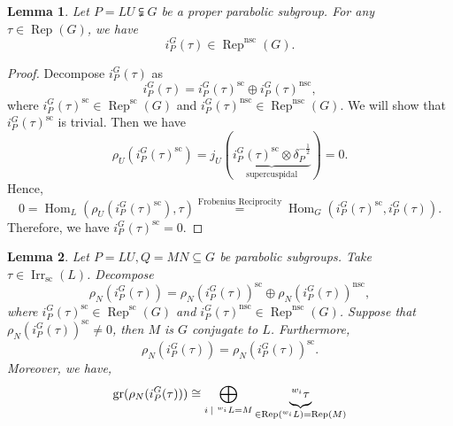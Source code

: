 \documentclass[8pt]{article}
\newtheorem{lemma}{Lemma}[section]
\DeclareMathOperator{\Rep}{Rep}
\DeclareMathOperator{\Hom}{Hom}
\DeclareMathOperator{\gr}{gr}
\DeclareMathOperator{\supcus}{sc}
\DeclareMathOperator{\nsc}{nsc}
\DeclareMathOperator{\Irr}{Irr}
\newcommand{\sep}[0]{\:|\:}
\begin{document}
\begin{lemma}
  \label{lemma_82}
  Let $P=LU\subsetneqq G$ be a proper parabolic subgroup. For any $\tau\in\Rep(G)$, we have 
  \begin{equation*}
    i_P^G(\tau)\in\Rep^{\nsc}(G).
  \end{equation*}
\end{lemma}

\begin{proof}
Decompose $i_P^G(\tau)$ as 
\begin{equation*}
  i_P^G(\tau) = i_P^G(\tau)^{\supcus}\oplus i_P^G(\tau)^{\nsc},
\end{equation*}
where $i_P^G(\tau)^{\supcus}\in\Rep^{\supcus}(G)$ and $ i_P^G(\tau)^{\nsc}\in\Rep^{\nsc}(G)$. We will show that $i_P^G(\tau)^{\supcus}$ is trivial. Then we have 
\begin{equation*}
  \rho_U(i_P^G(\tau)^{\supcus}) = j_U(\underbrace{i_P^G(\tau)^{\supcus}\otimes\delta_P^{-{\frac 1 2}}}_{\text{supercuspidal}}) = 0.
\end{equation*}
Hence, 
\begin{equation*}
  0 = \Hom_L(\rho_U(i_P^G(\tau)^{\supcus}), \tau) \stackrel{\text{Frobenius Reciprocity}}{=}\Hom_G(i_P^G(\tau)^{\supcus},i_P^G(\tau)).
\end{equation*}
Therefore, we have $i_P^G(\tau)^{\supcus} = 0$.
\end{proof}

\begin{lemma}
  \label{lemma_83}
  Let $P=LU,Q=MN\subseteq G$ be parabolic subgroups. Take $\tau\in\Irr_{\supcus}(L)$. Decompose 
\begin{equation*}
  \rho_N(i_P^G(\tau)) =\rho_N(i_P^G(\tau))^{\supcus}\oplus \rho_N(i_P^G(\tau))^{\nsc},
\end{equation*}
  where $i_P^G(\tau)^{\supcus}\in\Rep^{\supcus}(G)$ and $ i_P^G(\tau)^{\nsc}\in\Rep^{\nsc}(G)$. Suppose that $\rho_N(i_P^G(\tau))^{\supcus}\not=0$, then $M$ is $G$ conjugate to $L$. Furthermore,
  \begin{equation*}
    \rho_N(i_P^G(\tau)) = \rho_N(i_P^G(\tau))^{\supcus}.
  \end{equation*}
  Moreover, we have, 
  \begin{equation*}
    \gr(\rho_N(i_P^G(\tau)))\cong\bigoplus_{{i\sep \prescript{w_i}{}{L} = M}}\underbrace{\prescript{w_i}{}{\tau}}_{\in\Rep(\prescript{w_i}{}{L}) = \Rep(M)}
  \end{equation*}
\end{lemma}
\end{document}
